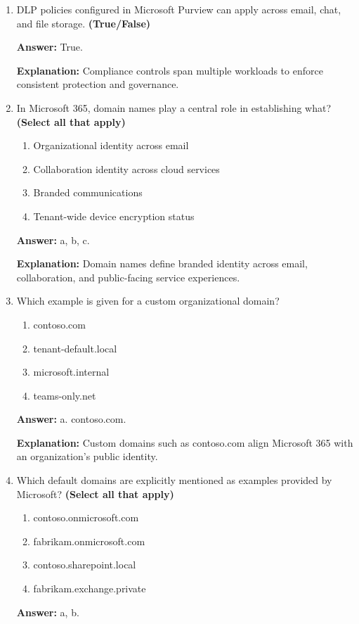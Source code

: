 \documentclass[10pt]{article}
\begin{document}
\begin{enumerate}[leftmargin=*]
\textbf{Explanation:} Identity-layer policy changes ripple across core Microsoft 365 services that rely on centralized access control.

\item DLP policies configured in Microsoft Purview can apply across email, chat, and file storage. \textbf{(True/False)}

\textbf{Answer:} True.

\textbf{Explanation:} Compliance controls span multiple workloads to enforce consistent protection and governance.

\item In Microsoft 365, domain names play a central role in establishing what? \textbf{(Select all that apply)}
\begin{enumerate}[label=\alph*., leftmargin=1.5em]
\item Organizational identity across email
\item Collaboration identity across cloud services
\item Branded communications
\item Tenant-wide device encryption status
\end{enumerate}
\textbf{Answer:} a, b, c.

\textbf{Explanation:} Domain names define branded identity across email, collaboration, and public-facing service experiences.

\item Which example is given for a custom organizational domain?
\begin{enumerate}[label=\alph*., leftmargin=1.5em]
\item contoso.com
\item tenant-default.local
\item microsoft.internal
\item teams-only.net
\end{enumerate}
\textbf{Answer:} a. contoso.com.

\textbf{Explanation:} Custom domains such as contoso.com align Microsoft 365 with an organization’s public identity.

\item Which default domains are explicitly mentioned as examples provided by Microsoft? \textbf{(Select all that apply)}
\begin{enumerate}[label=\alph*., leftmargin=1.5em]
\item contoso.onmicrosoft.com
\item fabrikam.onmicrosoft.com
\item contoso.sharepoint.local
\item fabrikam.exchange.private
\end{enumerate}
\textbf{Answer:} a, b.


\end{enumerate}
\end{document}
